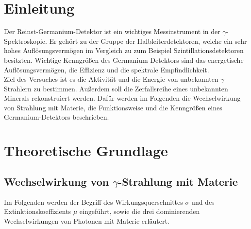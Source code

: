 \section{Einleitung}
Der Reinst-Germanium-Detektor ist ein wichtiges Messinstrument in der $\gamma$-Spektroskopie. Er gehört zu der Gruppe der Halbleiterdetektoren, welche ein sehr hohes Auflösungsvermögen im Vergleich zu zum Beispiel Szintillationsdetektoren besitzten. Wichtige Kenngrößen des Germanium-Detektors sind das energetische Auflösungsvermögen, die Effizienz und die spektrale Empfindlichkeit. \\
Ziel des Versuches ist es die Aktivität und die Energie von unbekannten $\gamma$-Strahlern zu bestimmen. Außerdem soll die Zerfallsreihe eines unbekannten Minerals rekonstruiert werden. Dafür werden im Folgenden die Wechselwirkung von Strahlung mit Materie, die Funktionsweise und die Kenngrößen eines Germanium-Detektors beschrieben. \\


\section{Theoretische Grundlage}
\label{sec:Theorie}

\subsection{Wechselwirkung von \texorpdfstring{$\gamma$}{}-Strahlung mit Materie}
Im Folgenden werden der Begriff des Wirkungsquerschnittes $\sigma$ und des Extinktionskoeffizients $\mu$ eingeführt, sowie die drei dominierenden Wechselwirkungen von Photonen mit Materie erläutert.



